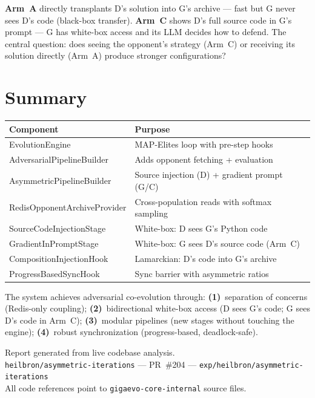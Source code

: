 \documentclass[11pt,a4paper]{article}
\begin{document}
\begin{designbox}[title={Why Lamarckian (Arm A) vs.\ Baldwinian (Arm C)?}]
\textbf{Arm~A} directly transplants D's solution into G's archive --- fast but G never sees D's code (black-box transfer).  \textbf{Arm~C} shows D's full source code in G's prompt --- G has white-box access and its LLM decides how to defend.  The central question: does seeing the opponent's strategy (Arm~C) or receiving its solution directly (Arm~A) produce stronger configurations?
\end{designbox}

\section{Summary}

\begin{table}[H]
\centering\small
\begin{tabular}{@{}p{4.5cm}p{9.5cm}@{}}
\toprule
\textbf{Component} & \textbf{Purpose} \\
\midrule
EvolutionEngine & MAP-Elites loop with pre-step hooks \\
AdversarialPipelineBuilder & Adds opponent fetching + evaluation \\
AsymmetricPipelineBuilder & Source injection (D) + gradient prompt (G/C) \\
RedisOpponentArchiveProvider & Cross-population reads with softmax sampling \\
SourceCodeInjectionStage & White-box: D sees G's Python code \\
GradientInPromptStage & White-box: G sees D's source code (Arm~C) \\
CompositionInjectionHook & Lamarckian: D's code into G's archive \\
ProgressBasedSyncHook & Sync barrier with asymmetric ratios \\
\bottomrule
\end{tabular}
\end{table}

The system achieves adversarial co-evolution through:
\textbf{(1)}~separation of concerns (Redis-only coupling);
\textbf{(2)}~bidirectional white-box access (D sees G's code; G sees D's code in Arm~C);
\textbf{(3)}~modular pipelines (new stages without touching the engine);
\textbf{(4)}~robust synchronization (progress-based, deadlock-safe).

\vfill
\begin{center}
\footnotesize
Report generated from live codebase analysis.\\
\texttt{heilbron/asymmetric-iterations} --- PR~\#204 --- \texttt{exp/heilbron/asymmetric-iterations}\\
All code references point to \texttt{gigaevo-core-internal} source files.
\end{center}
\end{document}
